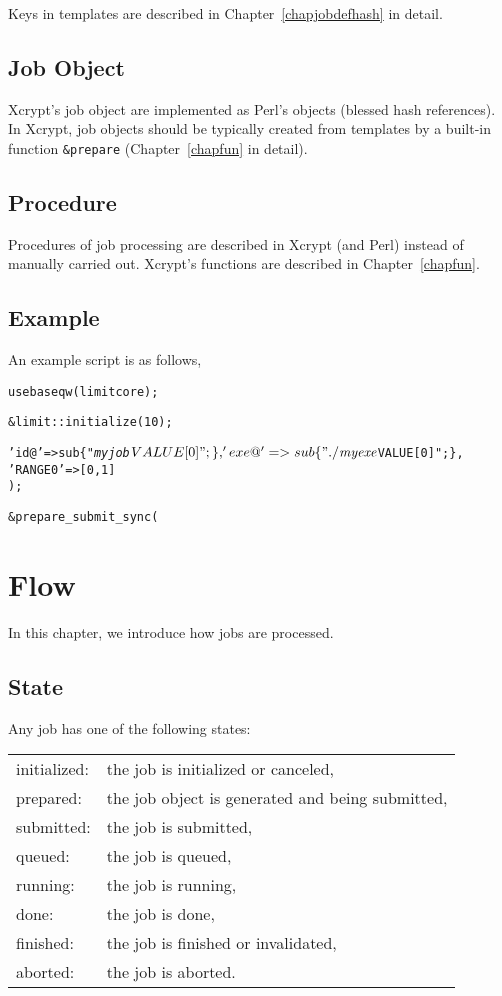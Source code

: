 \documentclass[a4paper,10pt]{report}
\begin{document}
Keys in templates are described in Chapter~\ref{chapjobdefhash} in
detail.

\section{Job Object}

Xcrypt's job object are implemented as Perl's objects (blessed hash
references).  In Xcrypt, job objects should be typically created from
templates by a built-in function \texttt{\&prepare}
(Chapter~\ref{chapfun} in detail).


\section{Procedure}

Procedures of job processing are described in Xcrypt (and Perl)
instead of manually carried out.
Xcrypt's functions are described in Chapter~\ref{chapfun}.

\section{Example}\label{secscriptexample}

An example script is as follows,
\begin{boxnote}
\begin{alltt}
use base qw(limit core);

&limit::initialize(10);

%template = (
 'id@' => sub \{ "\textit{myjob}$VALUE[0]"; \},
 'exe@' => sub \{ "./\textit{myexe} $VALUE[0]"; \},
 'RANGE0' => [0,1]
);

&prepare_submit_sync(%myjob);
\end{alltt}
\end{boxnote}


\chapter{Flow}

In this chapter, we introduce how jobs are processed.

\section{State}\label{sec:states}

Any job has one of the following states:
\begin{center}
\begin{tabular}{ll}
initialized: & the job is initialized or canceled,\\
prepared: & the job object is generated and being submitted,\\
submitted: & the job is submitted,\\
queued: & the job is queued,\\
running: & the job is running,\\
done: & the job is done,\\
finished: & the job is finished or invalidated,\\
aborted: & the job is aborted.
\end{tabular}
\end{center}
\end{document}
